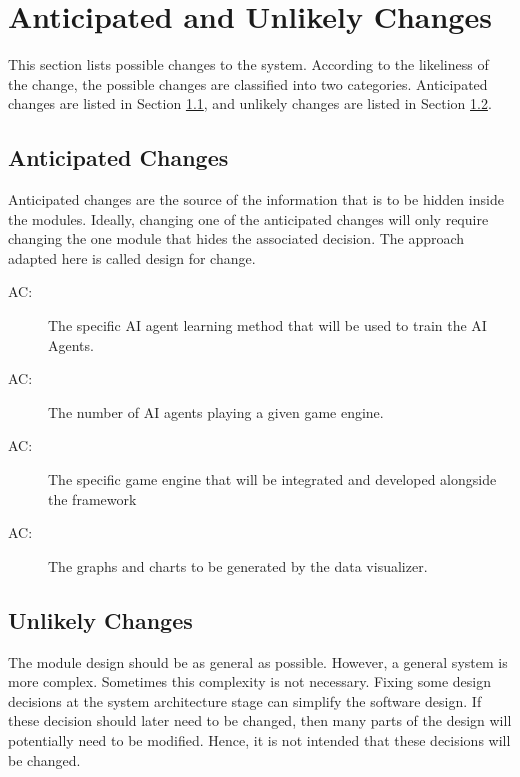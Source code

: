 \documentclass[12pt, titlepage]{article}
\newcounter{acnum}
\newcommand{\actheacnum}{AC\theacnum}
\begin{document}
\section{Anticipated and Unlikely Changes} \label{SecChange}

This section lists possible changes to the system. According to the likeliness
of the change, the possible changes are classified into two
categories. Anticipated changes are listed in Section \ref{SecAchange}, and
unlikely changes are listed in Section \ref{SecUchange}.

\subsection{Anticipated Changes} \label{SecAchange}

Anticipated changes are the source of the information that is to be hidden
inside the modules. Ideally, changing one of the anticipated changes will only
require changing the one module that hides the associated decision. The approach
adapted here is called design for
change.

\begin{description}
\item[ \actheacnum \label{acAI}:] The specific AI agent learning method that will be used to train the AI Agents.
\item[ \actheacnum \label{acAINum}:] The number of AI agents playing a given game engine.
\item[ \actheacnum \label{acGE}:] The specific game engine that will be integrated and developed alongside the framework 
\item[ \actheacnum \label{acDV}:] The graphs and charts to be generated by the data visualizer.
\end{description}

\subsection{Unlikely Changes} \label{SecUchange}

The module design should be as general as possible. However, a general system is
more complex. Sometimes this complexity is not necessary. Fixing some design
decisions at the system architecture stage can simplify the software design. If
these decision should later need to be changed, then many parts of the design
will potentially need to be modified. Hence, it is not intended that these
decisions will be changed.
\end{document}
